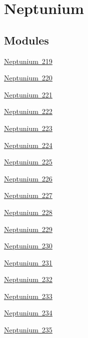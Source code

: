 \hypertarget{group___isotope_const-_neptunium}{}\section{Neptunium}
\label{group___isotope_const-_neptunium}
\subsection*{Modules}
\begin{DoxyCompactItemize}
\item 
\mbox{\hyperlink{group___isotope_const-_neptunium-_np219}{Neptunium 219}}
\item 
\mbox{\hyperlink{group___isotope_const-_neptunium-_np220}{Neptunium 220}}
\item 
\mbox{\hyperlink{group___isotope_const-_neptunium-_np221}{Neptunium 221}}
\item 
\mbox{\hyperlink{group___isotope_const-_neptunium-_np222}{Neptunium 222}}
\item 
\mbox{\hyperlink{group___isotope_const-_neptunium-_np223}{Neptunium 223}}
\item 
\mbox{\hyperlink{group___isotope_const-_neptunium-_np224}{Neptunium 224}}
\item 
\mbox{\hyperlink{group___isotope_const-_neptunium-_np225}{Neptunium 225}}
\item 
\mbox{\hyperlink{group___isotope_const-_neptunium-_np226}{Neptunium 226}}
\item 
\mbox{\hyperlink{group___isotope_const-_neptunium-_np227}{Neptunium 227}}
\item 
\mbox{\hyperlink{group___isotope_const-_neptunium-_np228}{Neptunium 228}}
\item 
\mbox{\hyperlink{group___isotope_const-_neptunium-_np229}{Neptunium 229}}
\item 
\mbox{\hyperlink{group___isotope_const-_neptunium-_np230}{Neptunium 230}}
\item 
\mbox{\hyperlink{group___isotope_const-_neptunium-_np231}{Neptunium 231}}
\item 
\mbox{\hyperlink{group___isotope_const-_neptunium-_np232}{Neptunium 232}}
\item 
\mbox{\hyperlink{group___isotope_const-_neptunium-_np233}{Neptunium 233}}
\item 
\mbox{\hyperlink{group___isotope_const-_neptunium-_np234}{Neptunium 234}}
\item 
\mbox{\hyperlink{group___isotope_const-_neptunium-_np235}{Neptunium 235}}

\end{DoxyCompactItemize}
